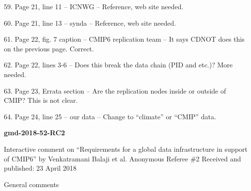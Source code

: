 \documentclass[gmd,manuscript]{copernicus}
\begin{document}
59. Page 21, line 11 – ICNWG – Reference, web site needed.

60. Page 21, line 13 – synda – Reference, web site needed.

61. Page 22, fig. 7 caption – CMIP6 replication team – It says CDNOT
does this on the previous page. Correct.

62. Page 22, lines 3-6 – Does this break the data chain (PID and
etc.)? More needed.

63. Page 23, Errata section – Are the replication nodes inside or
outside of CMIP? This is not clear.

64. Page 24, line 25 – our data – Change to “climate” or “CMIP” data.

\pagebreak


\textbf{gmd-2018-52-RC2}

Interactive comment on “Requirements for a
global data infrastructure in support of CMIP6” by
Venkatramani Balaji et al.
Anonymous Referee \#2
Received and published: 23 April 2018

General comments
\end{document}
